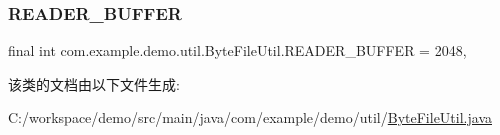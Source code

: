 \subsubsection{\texorpdfstring{R\+E\+A\+D\+E\+R\+\_\+\+B\+U\+F\+F\+ER}{READER\_BUFFER}}
{\footnotesize\ttfamily final int com.\+example.\+demo.\+util.\+Byte\+File\+Util.\+R\+E\+A\+D\+E\+R\+\_\+\+B\+U\+F\+F\+ER = 2048\hspace{0.3cm}{\ttfamily [static]}, {\ttfamily [private]}}



该类的文档由以下文件生成\+:\begin{DoxyCompactItemize}
\item 
C\+:/workspace/demo/src/main/java/com/example/demo/util/\mbox{\hyperlink{_byte_file_util_8java}{Byte\+File\+Util.\+java}}\end{DoxyCompactItemize}
